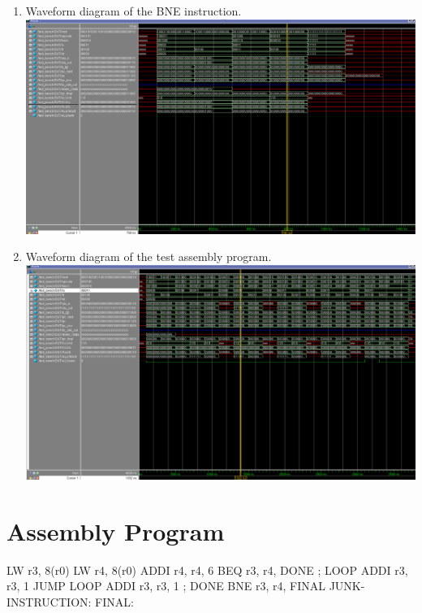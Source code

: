\documentclass[12pt]{article}
\begin{document}
\begin{enumerate}
    \item
    Waveform diagram of the BNE instruction.
    \includegraphics[scale=0.55]{img/bne_wave.png}

    \item
    Waveform diagram of the test assembly program.
    \includegraphics[scale=0.55]{img/test_program_wave.png}
\end{enumerate}

\section{Assembly Program}
LW r3, 8(r0)
LW r4, 8(r0)
ADDI r4, r4, 6
BEQ r3, r4, DONE ; LOOP
ADDI r3, r3, 1
JUMP LOOP
ADDI r3, r3, 1 ; DONE
BNE r3, r4, FINAL
JUNK-INSTRUCTION:
FINAL:
\end{document}
